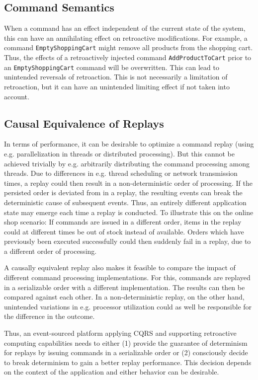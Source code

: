 \subsection{Command Semantics}
\label{sec:command-semantics}
When a command has an effect independent of the current state of the system, 
this can have an annihilating effect on retroactive modifications. For example, 
a command \texttt{EmptyShoppingCart} might remove all products from the 
shopping cart. 
Thus, the effects of a retroactively injected command \texttt{AddProductToCart} 
prior to an \texttt{EmptyShoppingCart} command will be overwritten.  
This can lead to unintended reversals of retroaction. This is not necessarily 
a limitation of retroaction, but it can have an unintended limiting effect if 
not taken into account.

\subsection{Causal Equivalence of Replays}
\label{sec:determinism}
In terms of performance, it can be desirable to optimize a command replay 
(using e.g. parallelization in threads or distributed processing). But this 
cannot be achieved trivially by e.g. arbitrarily distributing the command 
processing among threads.
Due to differences in e.g. thread scheduling or network transmission times, 
a replay could then result in a non-deterministic order of processing. 
If the persisted order is deviated from in a replay, the resulting events can 
break the deterministic cause of subsequent events.
Thus, an entirely different application state may emerge each time a replay 
is conducted.
%
To illustrate this on the online shop scenario: If  commands 
are issued in a different order, items in the replay could at different times 
be out of stock instead of available.
Orders which have previously been executed successfully could then suddenly 
fail in a replay, due to a different order of processing. 

A causally equivalent replay also makes it feasible to compare the impact of 
different command processing implementations. For this, commands are replayed 
in a serializable order with a different implementation.
The results can then be compared against each other.
In a non-deterministic replay, on the other hand, unintended variations in e.g. 
processor utilization could as well be responsible for the difference in the 
outcome.

Thus, an event-sourced platform applying CQRS and supporting retroactive 
computing capabilities needs to either (1) provide the guarantee of determinism 
for replays by issuing commands in a serializable order or (2) consciously 
decide to break determinism to gain a better replay performance.  
This decision depends on the context of the application and either behavior
can be desirable.

